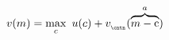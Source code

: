   \begin{equation}\begin{gathered}\begin{aligned}
        \vFunc(\mNrm) & = \max_{\cNrm}~ \uFunc(\cNrm) + \vFunc_{_\cntn}(\overbrace{\mNrm-\cFunc}^{\aNrm}) \label{eq:vMid}
      \end{aligned}\end{gathered}\end{equation}
